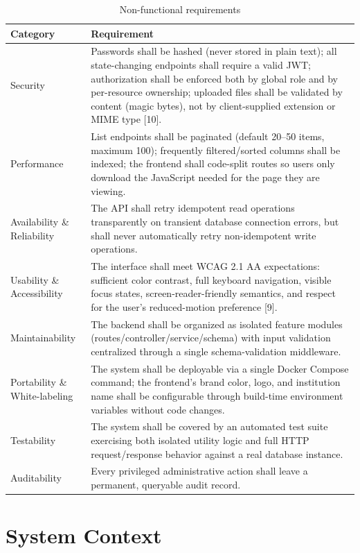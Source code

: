 \documentclass[12pt,oneside]{book}
\begin{document}
\begin{table}[H]
\caption{Non-functional requirements}
\label{tab:3.3}
\centering
\small
\begin{tabularx}{\textwidth}{@{}p{2.7cm}X@{}}
\toprule
Category & Requirement \\
\midrule
Security & Passwords shall be hashed (never stored in plain text); all state-changing endpoints shall require a valid JWT; authorization shall be enforced both by global role and by per-resource ownership; uploaded files shall be validated by content (magic bytes), not by client-supplied extension or MIME type [10]. \\
Performance & List endpoints shall be paginated (default 20--50 items, maximum 100); frequently filtered/sorted columns shall be indexed; the frontend shall code-split routes so users only download the JavaScript needed for the page they are viewing. \\
Availability \& Reliability & The API shall retry idempotent read operations transparently on transient database connection errors, but shall never automatically retry non-idempotent write operations. \\
Usability \& Accessibility & The interface shall meet WCAG 2.1 AA expectations: sufficient color contrast, full keyboard navigation, visible focus states, screen-reader-friendly semantics, and respect for the user's reduced-motion preference [9]. \\
Maintainability & The backend shall be organized as isolated feature modules (routes/controller/service/schema) with input validation centralized through a single schema-validation middleware. \\
Portability \& White-labeling & The system shall be deployable via a single Docker Compose command; the frontend's brand color, logo, and institution name shall be configurable through build-time environment variables without code changes. \\
Testability & The system shall be covered by an automated test suite exercising both isolated utility logic and full HTTP request/response behavior against a real database instance. \\
Auditability & Every privileged administrative action shall leave a permanent, queryable audit record. \\
\bottomrule
\end{tabularx}
\end{table}

\section{System Context}
\end{document}
